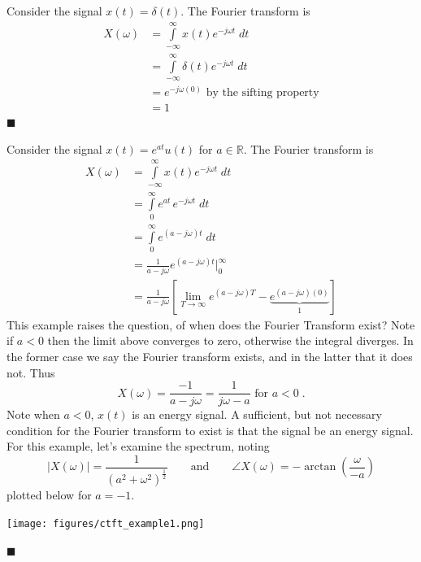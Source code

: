 \begin{example}
  Consider the signal $x(t) = \delta(t)$. The Fourier transform is
  \begin{align*}
    X(\omega) &= \int\limits_{-\infty}^{\infty} x(t) e^{-j\omega t}\; dt\\
    &= \int\limits_{-\infty}^{\infty} \delta(t) e^{-j\omega t}\; dt\\
    &= e^{-j\omega (0)} \mbox{ by the sifting property}\\
    &= 1
  \end{align*}
  $\blacksquare$
\end{example}
\begin{example}
Consider the signal $x(t) = e^{at}u(t)$ for $a\in \mathbb{R}$.  The Fourier transform is
  \begin{align*}
    X(\omega) &= \int\limits_{-\infty}^{\infty} x(t) e^{-j\omega t}\; dt\\
    &= \int\limits_{0}^{\infty}  e^{at} \, e^{-j\omega t}\; dt\\
    &= \int\limits_{0}^{\infty}  e^{(a-j\omega) t}\; dt\\
    &= \frac{1}{a-j\omega } e^{(a-j\omega) t} \Big|_{0}^{\infty}\\
    &= \frac{1}{a-j\omega } \left[ \lim_{T\rightarrow\infty} e^{(a-j\omega) T} - \underbrace{e^{(a-j\omega) (0)}}_{1}\right]
  \end{align*}
  This example raises the question, of when does the Fourier Transform exist? Note if $a < 0$ then the limit above converges to zero, otherwise the integral diverges. In the former case we say the Fourier transform exists, and in the latter that it does not. Thus
  \[
  X(\omega) = \frac{-1}{a-j\omega } = \frac{1}{j\omega-a} \mbox{ for } a < 0\;.
  \]
  Note when $a < 0$, $x(t)$ is an energy signal. A sufficient, but not necessary condition for the Fourier transform to exist is that the signal be an energy signal. For this example, let's examine the spectrum, noting
  \[
  |X(\omega)| = \frac{1}{(a^2 + \omega^2)^\frac{1}{2}} \hspace{2em}\mbox{and}\hspace{2em} \angle X(\omega) = -\arctan\left( \frac{\omega}{-a}\right)
  \]
  plotted below for $a = -1$.
  \begin{center}
\texttt{[image: figures/ctft\_example1.png]}
  \end{center}
  $\blacksquare$
\end{example}
